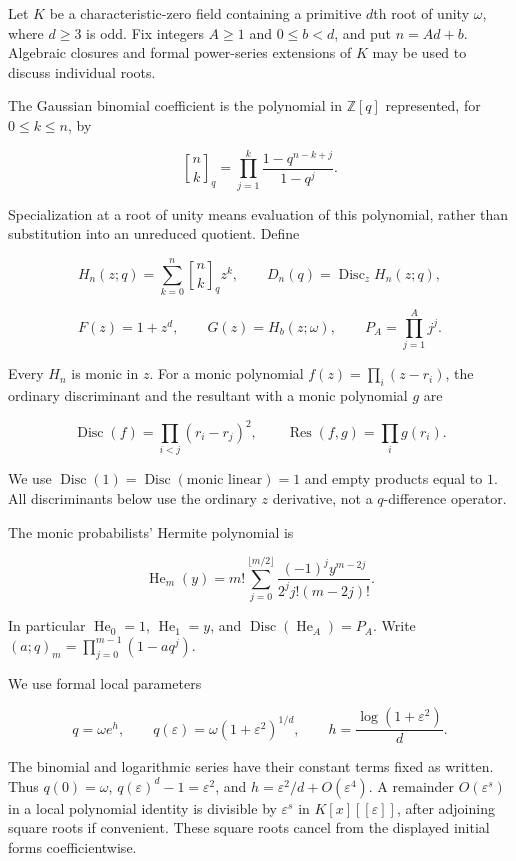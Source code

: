 \documentclass[
  11pt,
]{article}
\begin{document}
Let \(K\) be a characteristic-zero field containing a primitive \(d\)th
root of unity \(\omega\), where \(d\geq 3\) is odd. Fix integers
\(A\geq 1\) and \(0\leq b<d\), and put \(n=Ad+b\). Algebraic closures
and formal power-series extensions of \(K\) may be used to discuss
individual roots.

The Gaussian binomial coefficient is the polynomial in \(\mathbb Z[q]\)
represented, for \(0\leq k\leq n\), by

\[
\genfrac{[}{]}{0pt}{}{n}{k}_q=\prod_{j=1}^{k}\frac{1-q^{n-k+j}}{1-q^j}.
\]

Specialization at a root of unity means evaluation of this polynomial,
rather than substitution into an unreduced quotient. Define

\[
H_n(z;q)=\sum_{k=0}^{n}\genfrac{[}{]}{0pt}{}{n}{k}_q z^k,
\qquad D_n(q)=\operatorname{Disc}_z H_n(z;q),
\]

\[
F(z)=1+z^d,\qquad G(z)=H_b(z;\omega),\qquad
P_A=\prod_{j=1}^{A}j^j.
\]

Every \(H_n\) is monic in \(z\). For a monic polynomial
\(f(z)=\prod_i(z-r_i)\), the ordinary discriminant and the resultant
with a monic polynomial \(g\) are

\[
\operatorname{Disc}(f)=\prod_{i<j}(r_i-r_j)^2,
\qquad \operatorname{Res}(f,g)=\prod_i g(r_i).
\]

We use
\(\operatorname{Disc}(1)=\operatorname{Disc}(\text{monic linear})=1\)
and empty products equal to \(1\). All discriminants below use the
ordinary \(z\) derivative, not a \(q\)-difference operator.

The monic probabilists' Hermite polynomial is

\[
\operatorname{He}_m(y)=m!\sum_{j=0}^{\lfloor m/2\rfloor}
\frac{(-1)^j y^{m-2j}}{2^j j!(m-2j)!}.
\]

In particular \(\operatorname{He}_0=1\), \(\operatorname{He}_1=y\), and
\(\operatorname{Disc}(\operatorname{He}_A)=P_A\). Write
\((a;q)_m=\prod_{j=0}^{m-1}(1-aq^j)\).

We use formal local parameters

\[
q=\omega e^h,\qquad q(\varepsilon)=\omega(1+\varepsilon^2)^{1/d},
\qquad h=\frac{\log(1+\varepsilon^2)}{d}.
\]

The binomial and logarithmic series have their constant terms fixed as
written. Thus \(q(0)=\omega\), \(q(\varepsilon)^d-1=\varepsilon^2\), and
\(h=\varepsilon^2/d+O(\varepsilon^4)\). A remainder \(O(\varepsilon^s)\)
in a local polynomial identity is divisible by \(\varepsilon^s\) in
\(K[x][[\varepsilon]]\), after adjoining square roots if convenient.
These square roots cancel from the displayed initial forms
coefficientwise.
\end{document}
